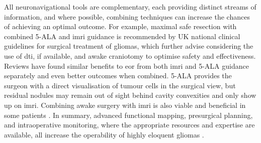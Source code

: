 All neuronavigational tools are complementary, each providing distinct streams of information, and where possible, combining techniques can increase the chances of achieving an optimal outcome.
For example, maximal safe resection with combined 5-ALA and \gls{imri} guidance is recommended by UK national clinical guidelines for surgical treatment of gliomas, which further advise considering the use of \gls{dti}, if available, and awake craniotomy to optimise safety and effectiveness\autocite{NICE2021}.
Reviews have found similar benefits to \gls{eor} from both \gls{imri} and 5-ALA guidance separately\autocite{Golub2020} and even better outcomes when combined\autocite{Nickel2018,Coburger2019}.
5-ALA provides the surgeon with a direct visualisation of tumour cells in the surgical view, but residual nodules may remain out of sight behind cavity convexities and only show up on \gls{imri}\autocite{SueroMolina2019}.
Combining awake surgery with \gls{imri} is also viable and beneficial in some patients \autocite{Motomura2017,Tuleasca2021}.
In summary, advanced functional mapping, presurgical planning, and intraoperative monitoring, where the appropriate resources and expertise are available\autocite{GeorgeZakiGhali2020}, all increase the operability of highly eloquent gliomas
\autocite{Bello2008,Krieg2013,DellaPuppa2013b,Magill2018}.
